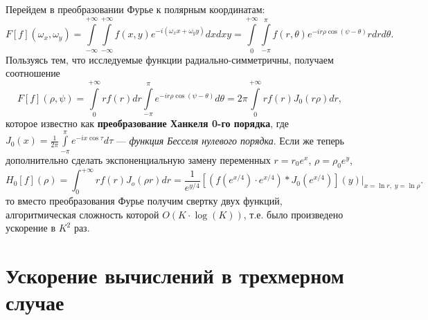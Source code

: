 Перейдем в преобразовании Фурье к полярным координатам: 
\begin{equation*}
 F[f](\omega_{x},\omega_{y})=\int\limits _{-\infty}^{+\infty}\int\limits _{-\infty}^{+\infty}f(x,y)e^{-i(\omega_{x}x+\omega_{y}y)}dxdxy=\int\limits _{0}^{+\infty}\int\limits _{-\pi}^{\pi}f(r,\theta)e^{-ir\rho\cos(\psi-\theta)}rdrd\theta.
\end{equation*}
Пользуясь тем, что исследуемые функции радиально-симметричны, получаем соотношение 
\begin{equation*}
F[f](\rho,\psi)=\int\limits _{0}^{+\infty}rf(r)dr\int\limits _{-\pi}^{\pi}e^{-ir\rho\cos(\psi-\theta)}d\theta=2\pi\int\limits _{0}^{+\infty}rf(r)J_{0}(r\rho)dr, 
\end{equation*}
которое известно как \textbf{{преобразование Ханкеля 0-го порядка}}, где $ J_{0}(x)=\frac{1}{2\pi}\int\limits _{-\pi}^{\pi}e^{-ix\cos\tau}d\tau $ --- \textit{функция Бесселя нулевого порядка}. Если же теперь дополнительно сделать экспоненциальную замену переменных $ r=r_{0}e^{x} $, $ \rho=\rho_{0}e^{y} $, 
\begin{equation*}
H_{0}[f](\rho)=\int_{0}^{+\infty}rf(r)J_{o}(\rho r)dr=\frac{1}{e^{y/4}}[(f(e^{x/4})\cdot e^{x/4})*J_{0}(e^{x/4})](y)|_{x=\ln r,\;y=\ln\rho}.
\end{equation*}
то вместо преобразования Фурье получим свертку двух функций, алгоритмическая сложность которой $ O(K\cdot\log(K)) $, т.е. было произведено ускорение в $ K^{2} $ раз.

\section{Ускорение вычислений в трехмерном случае}

